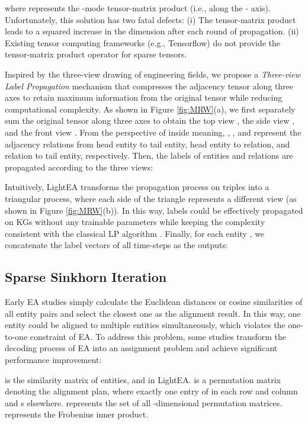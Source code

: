 \documentclass[11pt]{article}
\begin{document}
where  represents the -mode tensor-matrix product (i.e., along the - axis).
Unfortunately, this solution has two fatal defects:
(i) The tensor-matrix product leads to a squared increase in the dimension after each round of propagation.
(ii) Existing tensor computing frameworks (e.g., Tensorflow) do not provide the tensor-matrix product operator for sparse tensors.

Inspired by the three-view drawing of engineering fields, we propose a \emph{Three-view Label Propagation} mechanism that compresses the adjacency tensor  along three axes to retain maximum information from the original tensor while reducing computational complexity.
As shown in Figure \ref{fig:MRW}(a), we first separately sum the original tensor  along three axes to obtain the top view , the side view , and the front view .
From the perspective of inside meaning, , , and  represent the adjacency relations from head entity to tail entity, head entity to relation, and relation to tail entity, respectively.
Then, the labels of entities and relations are propagated according to the three views:

Intuitively, LightEA transforms the propagation process on triples into a triangular process, where each side of the triangle represents a different view (as shown in Figure \ref{fig:MRW}(b)).
In this way, labels could be effectively propagated on KGs without any trainable parameters while keeping the complexity consistent with the classical LP algorithm .
Finally, for each entity , we concatenate the label vectors of all time-steps as the outputs:


\subsection{Sparse Sinkhorn Iteration}
Early EA studies \cite{DBLP:conf/emnlp/WangLLZ18,DBLP:conf/semweb/SunHL17} simply calculate the Euclidean distances or cosine similarities of all entity pairs and select the closest one as the alignment result.
In this way, one entity could be aligned to multiple entities simultaneously, which violates the one-to-one constraint of EA.
To address this problem, some studies \cite{DBLP:conf/aaai/XuSFSY20, DBLP:conf/emnlp/MaoWWL21} transform the decoding process of EA into an assignment problem and achieve significant performance improvement:

 is the similarity matrix of entities, and  in LightEA.
 is a permutation matrix denoting the alignment plan, where exactly one entry of  in each row and column and s elsewhere.
 represents the set of all -dimensional permutation matrices.
 represents the Frobenius inner product.
\end{document}
